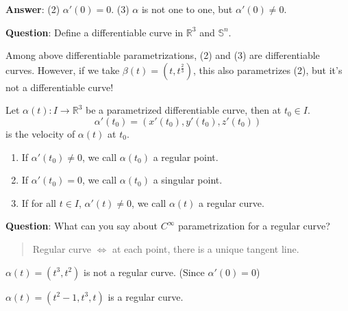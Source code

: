 \noindent
\textbf{Answer}:
    (2) $\alpha'(0)=0$.
    (3) $\alpha$ is not one to one, but $\alpha'(0)\neq 0$.

\noindent 
\textbf{Question}: Define a differentiable curve in $\mathbb{R}^3$ and $\mathbb{S}^n$.
\begin{remark}
    Among above differentiable parametrizations, (2) and (3) are differentiable curves. However, if we take $\beta(t)=(t,t^{\frac{2}{3}})$, this also parametrizes (2), but it's not a differentiable curve!
\end{remark}
\begin{defn}
    Let $\alpha(t)\colon I\to \mathbb{R}^3$ be a parametrized differentiable curve, then at $t_0\in I$.
    \[ \alpha'(t_0)=(x'(t_0),y'(t_0),z'(t_0))\]
    is the velocity of $\alpha(t)$ at $t_0$.
    \begin{enumerate}[(1)]
        \item If $\alpha'(t_0)\neq 0$, we call $\alpha(t_0)$ a regular point.
        \item If $\alpha'(t_0) = 0$, we call $\alpha(t_0)$ a singular point.
        \item If for all $t\in I$, $\alpha'(t)\neq 0$, we call $\alpha(t)$ a regular curve.
    \end{enumerate}
\end{defn}
\noindent
\textbf{Question}: What can you say about $C^\infty$ parametrization for a regular curve?
\begin{quotation}
Regular curve $\Longleftrightarrow $ at each point, there is a unique tangent line.
\end{quotation}
\begin{exam}
$\alpha(t)=(t^3,t^2)$ is not a regular curve. (Since $\alpha'(0)=0$)
\begin{center}
\end{center}
\end{exam}
\begin{exam}
$\alpha(t)=(t^2-1,t^3,t)$ is a regular curve.
\begin{center}
\end{center}
\end{exam}
